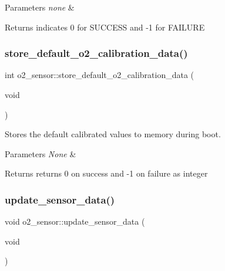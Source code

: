 \begin{DoxyParams}{Parameters}
{\em none} & \\
\hline
\end{DoxyParams}
\begin{DoxyReturn}{Returns}
indicates 0 for S\+U\+C\+C\+E\+SS and -\/1 for F\+A\+I\+L\+U\+RE 
\end{DoxyReturn}
\mbox{\label{group___ventilator_module_gabdf47205921998912383bd108cc1c417}} 
\subsubsection{\texorpdfstring{store\+\_\+default\+\_\+o2\+\_\+calibration\+\_\+data()}{store\_default\_o2\_calibration\_data()}}
{\footnotesize\ttfamily int o2\+\_\+sensor\+::store\+\_\+default\+\_\+o2\+\_\+calibration\+\_\+data (\begin{DoxyParamCaption}\item[{void}]{ }\end{DoxyParamCaption})\hspace{0.3cm}{\ttfamily [protected]}}



Stores the default calibrated values to memory during boot. 


\begin{DoxyParams}{Parameters}
{\em None} & \\
\hline
\end{DoxyParams}
\begin{DoxyReturn}{Returns}
returns 0 on success and -\/1 on failure as integer 
\end{DoxyReturn}
\mbox{\label{group___ventilator_module_ga460fc40d059c217fa41e4539cdb3c11d}} 
\subsubsection{\texorpdfstring{update\+\_\+sensor\+\_\+data()}{update\_sensor\_data()}\hspace{0.1cm}{\footnotesize\ttfamily [1/2]}}
{\footnotesize\ttfamily void o2\+\_\+sensor\+::update\+\_\+sensor\+\_\+data (\begin{DoxyParamCaption}\item[{void}]{ }\end{DoxyParamCaption})\hspace{0.3cm}{\ttfamily [virtual]}}



